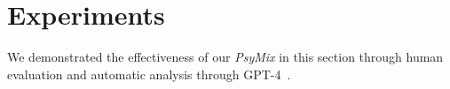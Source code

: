 \section{Experiments}
\label{sec:exp}

\begin{comment}
\begin{table*}[htbp]
    \centering
    \small
\begin{tabular}{lcccc}
\toprule
\textbf{}             & \textbf{Emotional Reactions} & \textbf{Interpretations} & \textbf{Explorations} & \textbf{Average} \\ 
\midrule
\textit{naive}        & 1.3563                       & 1.7864                   & 1.9242        & 1.6890         \\
\textit{empathy CoT}  & 1.4953                       & 2.1008                   & \textbf{2.4837}        & 2.0266        \\ 
\textit{therapy CoT}  & 1.5283                       & 2.1404                   & \uline{2.3182}        & 1.9956        \\
\textit{filtered therapy CoT}  & \uline{1.6880}                       & \uline{2.2282}                   & 2.2764        & \uline{2.0642}        \\ 
\textit{ChatGPT}  & \textbf{2.1671}                       & \textbf{2.5980}                   & 1.9633        & \textbf{2.2428}        \\ 
\midrule
\textit{ground truth} & 1.5530                       & 2.0903                   & 2.4734        & 2.0389        \\
\bottomrule
\end{tabular}%

//amount of xxx, similar 
\caption{Empathy Measurement Results Scored by GPT-4 across Three Dimensions Introduced in \citet{sharma-etal-2020-computational}. \KZ{Pls say what is underlined and what is bolded. I also find it a bit puzzling that ground truth is not as good as ChatGPT or even other kinds of CoT. If the human expert is not that good, then what's the point for us to be ``inspired'' by them? Or are we saying that these therapists who participated in the dataset collection are not really experienced?}}
\label{tab:gpt4score}
\end{table*}
\end{comment}

We demonstrated the effectiveness of our \textit{PsyMix} in this section through human evaluation and automatic analysis through GPT-4~\cite{openai2023gpt4}. 

